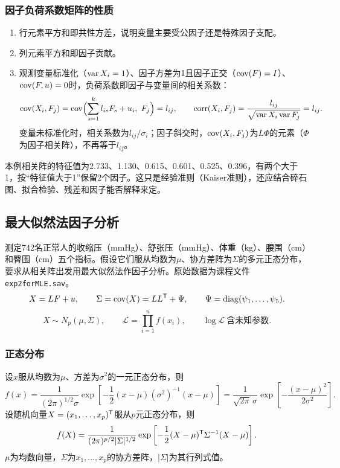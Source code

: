 \subsubsection{因子负荷系数矩阵的性质}
\begin{enumerate}
\item 行元素平方和即共性方差，说明变量主要受公因子还是特殊因子支配。
\item 列元素平方和即因子贡献。
\item 观测变量标准化（$\operatorname{var} X_i=1$）、因子方差为1且因子正交（$\operatorname{cov}(F)=I$）、$\operatorname{cov}(F,u)=0$时，负荷系数即因子与变量间的相关系数：
\[
\cov(X_i,F_j)=\cov\Bigl(\sum_{s=1}^kl_{is}F_s+u_i,\ F_j\Bigr)=l_{ij},\qquad
\operatorname{corr}(X_i,F_j)=\frac{l_{ij}}{\sqrt{\var X_i\var F_j}}=l_{ij}.
\]
变量未标准化时，相关系数为$l_{ij}/\sigma_i$；因子斜交时，$\operatorname{cov}(X_i,F_j)$为$L\Phi$的元素（$\Phi$为因子相关阵），不再等于$l_{ij}$。
\end{enumerate}
本例相关阵的特征值为2.733、1.130、0.615、0.601、0.525、0.396，有两个大于1，按“特征值大于1”保留2个因子。这只是经验准则（Kaiser准则），还应结合碎石图、拟合检验、残差和因子能否解释来定。
\subsection{最大似然法因子分析}
测定742名正常人的收缩压（mmHg）、舒张压（mmHg）、体重（kg）、腰围（cm）和臀围（cm）五个指标。假设它们服从均数为$\mu$、协方差阵为$\Sigma$的多元正态分布，要求从相关阵出发用最大似然法作因子分析。原始数据为课程文件\texttt{exp2forMLE.sav}。
\[
X=LF+u,\qquad \Sigma=\operatorname{cov}(X)=LL^{\mathsf T}+\Psi,\qquad
\Psi=\operatorname{diag}(\psi_1,\ldots,\psi_5).
\]
\[
X\sim N_p(\mu,\Sigma),\qquad\mathcal L=\prod_{i=1}^n f(x_i),\qquad\log\mathcal L\ \text{含未知参数}.
\]
\subsubsection{正态分布}
设$x$服从均数为$\mu$、方差为$\sigma^2$的一元正态分布，则
\[
f(x)=\frac{1}{(2\pi)^{1/2}\sigma}\exp\left[-\frac12(x-\mu)(\sigma^2)^{-1}(x-\mu)\right]=\frac{1}{\sqrt{2\pi}\,\sigma}\exp\left[-\frac{(x-\mu)^2}{2\sigma^2}\right].
\]
设随机向量$X=(x_1,\ldots,x_p)^{\mathsf T}$服从$p$元正态分布，则
\begin{equation}
f(X)=\frac{1}{(2\pi)^{p/2}|\Sigma|^{1/2}}
\exp\left[-\frac12(X-\mu)^{\mathsf T}\Sigma^{-1}(X-\mu)\right].
\end{equation}
$\mu$为均数向量，$\Sigma$为$x_1,\ldots,x_p$的协方差阵，$|\Sigma|$为其行列式值。
